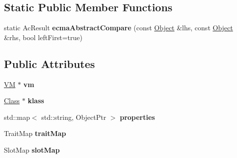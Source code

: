 \subsection*{Static Public Member Functions}
\begin{DoxyCompactItemize}
\item 
\hypertarget{classjswf_1_1avm2_1_1_object_acbeac16ed3dcedf342afe5ec12d928c9}{static Ac\+Result {\bfseries ecma\+Abstract\+Compare} (const \hyperlink{classjswf_1_1avm2_1_1_object}{Object} \&lhs, const \hyperlink{classjswf_1_1avm2_1_1_object}{Object} \&rhs, bool left\+First=true)}\label{classjswf_1_1avm2_1_1_object_acbeac16ed3dcedf342afe5ec12d928c9}

\end{DoxyCompactItemize}
\subsection*{Public Attributes}
\begin{DoxyCompactItemize}
\item 
\hypertarget{classjswf_1_1avm2_1_1_object_adf9ff969fcf2e2ab376b1728ceeee19a}{\hyperlink{classjswf_1_1avm2_1_1_v_m}{V\+M} $\ast$ {\bfseries vm}}\label{classjswf_1_1avm2_1_1_object_adf9ff969fcf2e2ab376b1728ceeee19a}

\item 
\hypertarget{classjswf_1_1avm2_1_1_object_a1ac6b806f384717a84531e7324f56759}{\hyperlink{classjswf_1_1avm2_1_1_class}{Class} $\ast$ {\bfseries klass}}\label{classjswf_1_1avm2_1_1_object_a1ac6b806f384717a84531e7324f56759}

\item 
\hypertarget{classjswf_1_1avm2_1_1_object_af0f1f97db35db3c17ab3eb71917807f3}{std\+::map$<$ std\+::string, Object\+Ptr $>$ {\bfseries properties}}\label{classjswf_1_1avm2_1_1_object_af0f1f97db35db3c17ab3eb71917807f3}

\item 
\hypertarget{classjswf_1_1avm2_1_1_object_a0a08815bef436dbad7220c902e39eb34}{Trait\+Map {\bfseries trait\+Map}}\label{classjswf_1_1avm2_1_1_object_a0a08815bef436dbad7220c902e39eb34}

\item 
\hypertarget{classjswf_1_1avm2_1_1_object_a4fc3061d5a26c1ce10cb4384663c3065}{Slot\+Map {\bfseries slot\+Map}}\label{classjswf_1_1avm2_1_1_object_a4fc3061d5a26c1ce10cb4384663c3065}

\end{DoxyCompactItemize}


